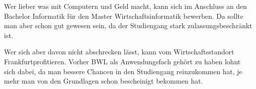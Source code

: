 Wer lieber was mit Computern und Geld macht, kann sich im Anschluss an den Bachelor Informatik f\"ur den Master Wirtschaftsinformatik bewerben. Da sollte man aber schon gut gewesen sein, da der Studiengang stark zulassungsbeschr\"ankt ist.

Wer sich aber davon nicht abschrecken l\"asst, kann vom \glqq{ }Wirtschaftsstandort Frankfurt\texttrademark{ }profitieren\texttrademark\grqq{}.
Vorher BWL als Anwendungsfach geh\"ort zu haben lohnt sich dabei, da man bessere Chancen in den Studiengang reinzukommen hat,
je mehr man von den Grundlagen schon bescheinigt bekommen hat.
